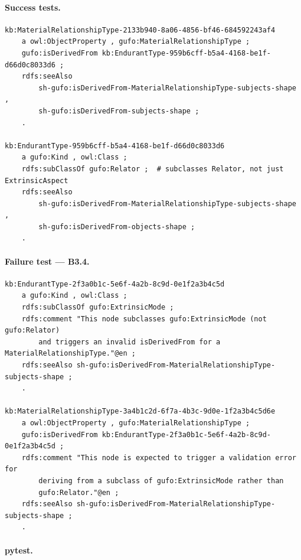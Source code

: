 \documentclass[12pt,a4paper]{article}
\begin{document}
\paragraph{Success tests.}

\begin{lstlisting}[style=turtlestyle]
kb:MaterialRelationshipType-2133b940-8a06-4856-bf46-684592243af4
    a owl:ObjectProperty , gufo:MaterialRelationshipType ;
    gufo:isDerivedFrom kb:EndurantType-959b6cff-b5a4-4168-be1f-d66d0c8033d6 ;
    rdfs:seeAlso
        sh-gufo:isDerivedFrom-MaterialRelationshipType-subjects-shape ,
        sh-gufo:isDerivedFrom-subjects-shape ;
    .

kb:EndurantType-959b6cff-b5a4-4168-be1f-d66d0c8033d6
    a gufo:Kind , owl:Class ;
    rdfs:subClassOf gufo:Relator ;  # subclasses Relator, not just ExtrinsicAspect
    rdfs:seeAlso
        sh-gufo:isDerivedFrom-MaterialRelationshipType-subjects-shape ,
        sh-gufo:isDerivedFrom-objects-shape ;
    .
\end{lstlisting}

\paragraph{Failure test --- B3.4.}

\begin{lstlisting}[style=turtlestyle]
kb:EndurantType-2f3a0b1c-5e6f-4a2b-8c9d-0e1f2a3b4c5d
    a gufo:Kind , owl:Class ;
    rdfs:subClassOf gufo:ExtrinsicMode ;
    rdfs:comment "This node subclasses gufo:ExtrinsicMode (not gufo:Relator)
        and triggers an invalid isDerivedFrom for a MaterialRelationshipType."@en ;
    rdfs:seeAlso sh-gufo:isDerivedFrom-MaterialRelationshipType-subjects-shape ;
    .

kb:MaterialRelationshipType-3a4b1c2d-6f7a-4b3c-9d0e-1f2a3b4c5d6e
    a owl:ObjectProperty , gufo:MaterialRelationshipType ;
    gufo:isDerivedFrom kb:EndurantType-2f3a0b1c-5e6f-4a2b-8c9d-0e1f2a3b4c5d ;
    rdfs:comment "This node is expected to trigger a validation error for
        deriving from a subclass of gufo:ExtrinsicMode rather than
        gufo:Relator."@en ;
    rdfs:seeAlso sh-gufo:isDerivedFrom-MaterialRelationshipType-subjects-shape ;
    .
\end{lstlisting}

\paragraph{pytest.}
\end{document}
